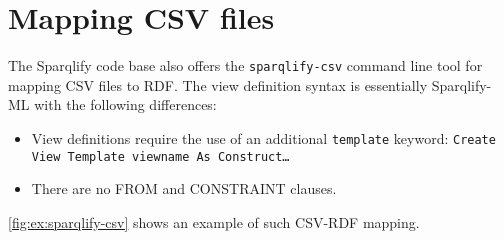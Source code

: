 \documentclass[a4paper,twoside,bibtotoc,abstracton,12pt,BCOR=15mm]{scrreprt}
\begin{document}
\newpage
\section{Mapping CSV files}
The Sparqlify code base also offers the \texttt{sparqlify-csv} command line tool for mapping CSV files to RDF.
The view definition syntax is essentially Sparqlify-ML with the following differences:
\begin{itemize}
  \item View definitions require the use of an additional \texttt{template} keyword: \texttt{Create View Template viewname As Construct\ldots}
  \item There are no FROM and CONSTRAINT clauses.
\end{itemize}
\autoref{fig:ex:sparqlify-csv} shows an example of such CSV-RDF mapping.
\end{document}
